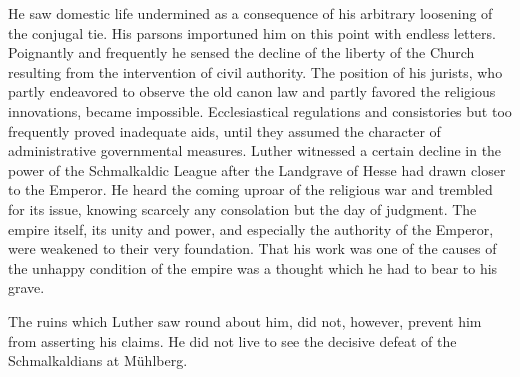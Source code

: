 He saw domestic life undermined as a consequence of his arbitrary
loosening of the conjugal tie. His parsons importuned him on this
point with endless letters. Poignantly and frequently he sensed the
decline of the liberty of the Church resulting from the intervention
of civil authority. The position of his jurists, who partly endeavored
to observe the old canon law and partly favored the religious innovations,
became impossible. Ecclesiastical regulations and consistories
but too frequently proved inadequate aids, until they assumed the
character of administrative governmental measures. Luther witnessed
a certain decline in the power of the Schmalkaldic League after the
Landgrave of Hesse had drawn closer to the Emperor. He heard the
coming uproar of the religious war and trembled for its issue, knowing
scarcely any consolation but the day of judgment. The empire
itself, its unity and power, and especially the authority of the Emperor,
were weakened to their very foundation. That his work was
one of the causes of the unhappy condition of the empire was a
thought which he had to bear to his grave.

The ruins which Luther saw round about him, did not, however,
prevent him from asserting his claims. He did not live to see the decisive
defeat of the Schmalkaldians at Mühlberg.
